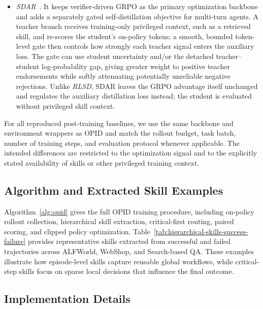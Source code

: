 \begin{itemize}
    \item \textit{SDAR}~\citep{lu2026sdar}. It keeps verifier-driven GRPO as the primary optimization backbone and adds a separately gated self-distillation objective for multi-turn agents. A teacher branch receives training-only privileged context, such as a retrieved skill, and re-scores the student's on-policy tokens; a smooth, bounded token-level gate then controls how strongly each teacher signal enters the auxiliary loss. The gate can use student uncertainty and/or the detached teacher--student log-probability gap, giving greater weight to positive teacher endorsements while softly attenuating potentially unreliable negative rejections. Unlike \textit{RLSD}, SDAR leaves the GRPO advantage itself unchanged and regulates the auxiliary distillation loss instead; the student is evaluated without privileged skill context.
\end{itemize}

For all reproduced post-training baselines, we use the same backbone and environment wrappers as OPID and match the rollout budget, task batch, number of training steps, and evaluation protocol whenever applicable. The intended differences are restricted to the optimization signal and to the explicitly stated availability of skills or other privileged training context.

\subsection{Algorithm and Extracted Skill Examples}
\label{app:algorithm_skills}
Algorithm~\ref{alg:opid} gives the full OPID training procedure, including on-policy rollout collection, hierarchical skill extraction, critical-first routing, paired scoring, and clipped policy optimization. Table~\ref{tab:hierarchical-skills-success-failure} provides representative skills extracted from successful and failed trajectories across ALFWorld, WebShop, and Search-based QA. These examples illustrate how episode-level skills capture reusable global workflows, while critical-step skills focus on sparse local decisions that influence the final outcome.




\subsection{Implementation Details}\label{app:implementation_details}
